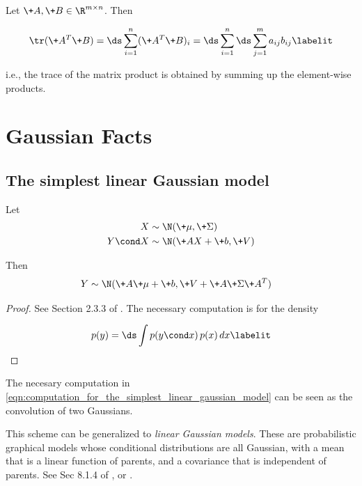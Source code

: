 \documentclass{article} %
\begin{document}
Let $\+A, \+B \in \R^{m \times n}$.  Then 

\begin{align*}
\tr (\+A^T \+B) = \ds\sum_{i=1}^n (\+A^T \+B)_i = \ds\sum_{i=1}^n \ds\sum_{j=1}^m a_{ij} b_{ij}
\labelit \label{eqn:trace_of_matrix_product}
\end{align*}

i.e.,  the trace of the matrix product is obtained by summing up the element-wise products. 


\section{Gaussian Facts}

\subsection{The simplest linear Gaussian model}

\begin{proposition}
\label{prop:simplest_linear_gaussian_model}
Let
\begin{align*}
X &\sim \N(\+\mu,  \+\Sigma) \\
Y \cond X &\sim \N(\+AX+\+b,  \+V) \\
\end{align*}

Then
\begin{align*}
Y &\sim \N(\+A \+\mu + \+b,  \+V + \+A \+\Sigma \+A^T)
\end{align*}
\end{proposition}

\begin{proof}
See Section 2.3.3 of \cite{bishop2006pattern}.    The necessary computation is for the density

\begin{align*}
p(y)  = \ds\int p(y \cond x) \,  p(x) \,  dx
\labelit \label{eqn:computation_for_the_simplest_linear_gaussian_model}
\end{align*}
\end{proof}


\begin{remark}
The necesary computation in \eqref{eqn:computation_for_the_simplest_linear_gaussian_model} can be seen as the convolution of two Gaussians.
\end{remark}


\begin{remark}
This scheme can be generalized to \textit{linear Gaussian models}.  These are probabilistic graphical models whose conditional distributions are all Gaussian,  with a mean that is a linear function of parents,  and a covariance that is independent of parents.   See Sec 8.1.4 of \cite{bishop2006pattern}, or \cite{roweis1999unifying}.   
\end{remark}
\end{document}
